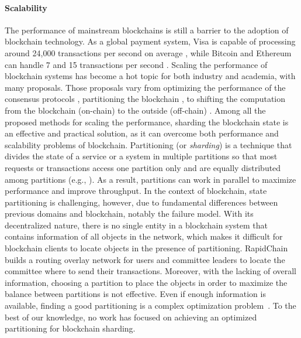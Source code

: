 \paragraph*{Scalability} The performance of mainstream blockchains is still a
barrier to the adoption of blockchain technology. As a global payment system,
Visa is capable of processing around 24,000 transactions per second on average
\cite{visa}, while Bitcoin and Ethereum can handle 7 and 15 transactions per
second \cite{ethereum:sharding, nakamoto2019bitcoin}. Scaling the performance of
blockchain systems has become a hot topic for both industry and academia, with
many proposals. Those proposals vary from optimizing the performance of the
consensus protocols \cite{dang2019towards}, partitioning the blockchain
\cite{wang2019sok}, to shifting the computation from the blockchain (on-chain)
to the outside (off-chain) \cite{teutsch2019scalable, network2018cheap}. Among
all the proposed methods for scaling the performance, sharding the blockchain state
is an effective and practical solution, as it can overcome both performance and
scalability problems of blockchain. Partitioning (or \emph{sharding}) is a
technique that divides the state of a service or a system in multiple partitions
so that most requests or transactions access one partition only and are equally
distributed among partitions (e.g., \cite{facebookTAO, sciascia2012sdur,
aguilera2007sinfonia}). As a result, partitions can work in parallel to maximize
performance and improve throughput. In the context of blockchain, state
partitioning is challenging, however, due to fundamental differences between
previous domains and blockchain, notably the failure model. With its
decentralized nature, there is no single entity in a blockchain system that
contains information of all objects in the network, which makes it difficult for
blockchain clients to locate objects in the presence of partitioning. RapidChain
\cite{zamani2018rapidchain} builds a routing overlay network for users and
committee leaders to locate the committee where to send their transactions.
Moreover, with the lacking of overall information, choosing a partition to place
the objects in order to maximize the balance between partitions is not
effective. Even if enough information is available, finding a good partitioning
is a complex optimization problem~\cite{curino2010sch,taft2014est}. To the best
of our knowledge, no work has focused on achieving an optimized partitioning for
blockchain sharding.

